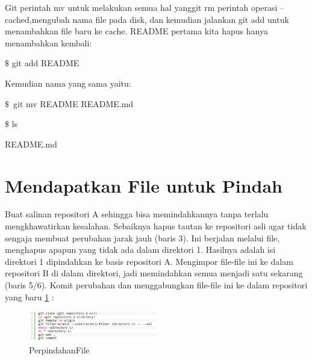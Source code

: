 \vspace{10pt}
\hspace*{0.5in} Git perintah mv untuk melakukan semua hal yanggit rm perintah operasi --cached,mengubah nama file pada disk, dan kemudian jalankan git add untuk menambahkan file baru ke cache.  README pertama kita hapus hanya menambahkan kembali:  \par
\noindent 
{\fontsize{10pt}{10pt}\selectfont  $  \$  $ git add README } \par
\vspace{12pt}
\noindent 
Kemudian nama yang sama yaitu:  \par
\noindent 
{\fontsize{10pt}{10pt}\selectfont  $  \$  $~git mv README  README.md} \par
\noindent 
{\fontsize{10pt}{10pt}\selectfont  $  \$  $ ls} \par
\noindent 
{\fontsize{10pt}{10pt}\selectfont README.md} 

\section{Mendapatkan File untuk Pindah}
\hspace*{0.5in} Buat salinan repositori A sehingga bisa memindahkannya tanpa terlalu mengkhawatirkan kesalahan. Sebaiknya hapus tautan ke repositori asli agar tidak sengaja membuat perubahan jarak jauh (baris 3). Ini berjalan melalui file, menghapus apapun yang tidak ada dalam direktori 1. Hasilnya adalah isi direktori 1 dipindahkan ke basis repositori A. Mengimpor file-file ini ke dalam repositori B di dalam direktori, jadi memindahkan semua menjadi satu sekarang (baris 5/6). Komit perubahan dan menggabungkan file-file ini ke dalam repositori yang baru \ref{PerpindahanFile} :
\begin{figure}[ht]
	\centerline{\includegraphics[width=0.50\textwidth]{Figures/PerpindahanFile}}
	\caption{PerpindahanFile}
	\label{PerpindahanFile}
\end{figure}